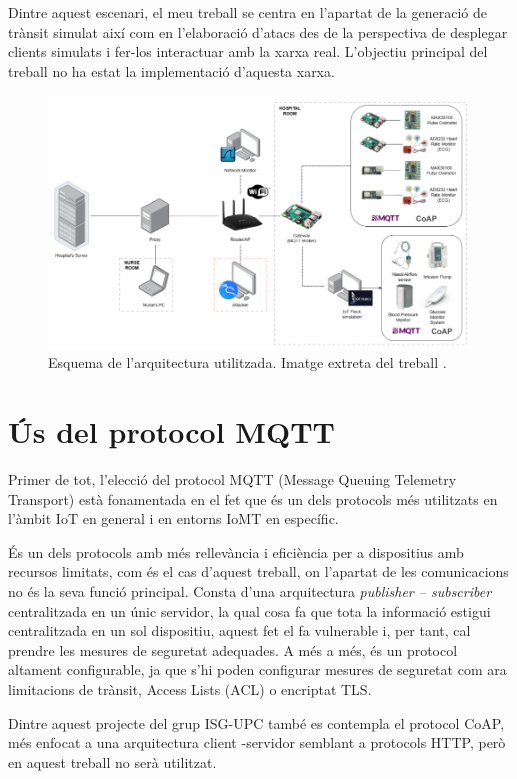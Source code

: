   Dintre aquest escenari, el meu treball se centra en l’apartat de la generació de trànsit simulat així com en l’elaboració d’atacs des de la perspectiva de desplegar clients simulats i fer-los interactuar amb la xarxa real. L’objectiu principal del treball no ha estat la implementació d’aquesta xarxa.

  \begin{figure}[H]
    \centering
    \includegraphics[width=1\textwidth]{img/MIOTTA_UPC.png}
    \caption{Esquema de l'arquitectura utilitzada. Imatge extreta del treball \cite{miottaupcfig}.}
    \label{fig:MQTT}
  \end{figure}

\section{Ús del protocol MQTT}
  Primer de tot, l’elecció del protocol MQTT (Message Queuing Telemetry Transport) està fonamentada en el fet que és un dels protocols més utilitzats en l’àmbit IoT en general i en entorns IoMT en específic.

  És un dels protocols amb més rellevància i eficiència per a dispositius amb recursos limitats, com és el cas d’aquest treball, on l’apartat de les comunicacions no és la seva funció principal. Consta d’una arquitectura \textit{publisher – subscriber} centralitzada en un únic servidor, la qual cosa fa que tota la informació estigui centralitzada en un sol dispositiu, aquest fet el fa vulnerable i, per tant, cal prendre les mesures de seguretat adequades. A més a més, és un protocol altament configurable, ja que s’hi poden configurar mesures de seguretat com ara limitacions de trànsit, Access Lists (ACL) o encriptat TLS.

  Dintre aquest projecte del grup ISG-UPC també es contempla el protocol CoAP, més enfocat a una arquitectura client -servidor semblant a protocols HTTP, però en aquest treball no serà utilitzat.

